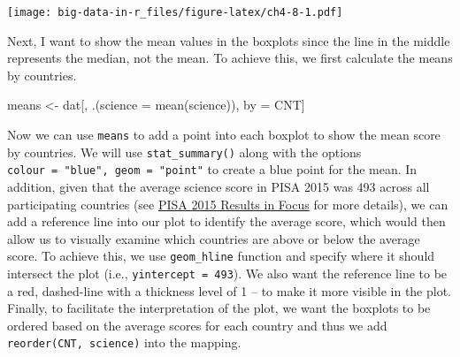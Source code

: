 \documentclass[
]{book}
\newenvironment{Shaded}{\begin{snugshade}}{\end{snugshade}}
\newcommand{\AttributeTok}[1]{\textcolor[rgb]{0.77,0.63,0.00}{#1}}
\newcommand{\FunctionTok}[1]{\textcolor[rgb]{0.00,0.00,0.00}{#1}}
\newcommand{\NormalTok}[1]{#1}
\newcommand{\OtherTok}[1]{\textcolor[rgb]{0.56,0.35,0.01}{#1}}
\begin{document}
\texttt{[image: big-data-in-r\_files/figure-latex/ch4-8-1.pdf]}

Next, I want to show the mean values in the boxplots since the line in the middle represents the median, not the mean. To achieve this, we first calculate the means by countries.

\begin{Shaded}
\begin{Highlighting}[]
\NormalTok{means }\OtherTok{\textless{}{-}}\NormalTok{ dat[,}
\NormalTok{             .(}\AttributeTok{science =} \FunctionTok{mean}\NormalTok{(science)),}
\NormalTok{             by }\OtherTok{=}\NormalTok{ CNT]}
\end{Highlighting}
\end{Shaded}

Now we can use \texttt{means} to add a point into each boxplot to show the mean score by countries. We will use \texttt{stat\_summary()} along with the options \texttt{colour\ =\ "blue",\ geom\ =\ "point"} to create a blue point for the mean. In addition, given that the average science score in PISA 2015 was 493 across all participating countries (see \href{https://www.oecd.org/pisa/pisa-2015-results-in-focus.pdf}{PISA 2015 Results in Focus} for more details), we can add a reference line into our plot to identify the average score, which would then allow us to visually examine which countries are above or below the average score. To achieve this, we use \texttt{geom\_hline} function and specify where it should intersect the plot (i.e., \texttt{yintercept\ =\ 493}). We also want the reference line to be a red, dashed-line with a thickness level of 1 -- to make it more visible in the plot. Finally, to facilitate the interpretation of the plot, we want the boxplots to be ordered based on the average scores for each country and thus we add \texttt{reorder(CNT,\ science)} into the mapping.
\end{document}
